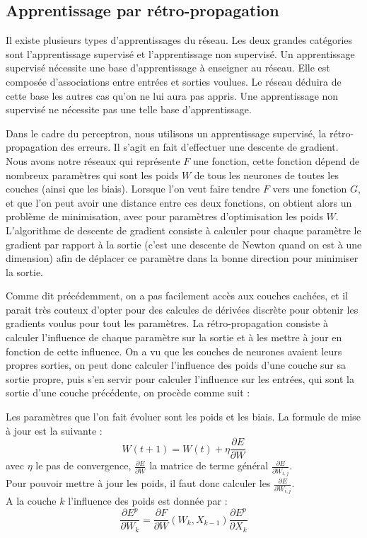 
\subsection{Apprentissage par rétro-propagation}

Il existe plusieurs types d'apprentissages du réseau. Les deux grandes catégories sont l'apprentissage supervisé et l'apprentissage non supervisé. 
Un apprentissage supervisé nécessite une base d'apprentissage à enseigner au réseau. Elle est composée d'associations entre entrées et sorties voulues. Le réseau déduira de cette base les autres cas qu'on ne lui aura pas appris. Une apprentissage non supervisé ne nécessite pas une telle base d'apprentissage.

Dans le cadre du perceptron, nous utilisons un apprentissage supervisé, la rétro-propagation des erreurs. Il s'agit en fait d'effectuer une descente de gradient. Nous avons notre réseaux qui représente $F$ une fonction, cette fonction dépend de nombreux paramètres qui sont les poids $W$ de tous les neurones de toutes les couches (ainsi que les biais). Lorsque l'on veut faire tendre $F$ vers une fonction $G$, et que l'on peut avoir une distance entre ces deux fonctions, on obtient alors un problème de minimisation, avec pour paramètres d'optimisation les poids $W$. L'algorithme de descente de gradient consiste à calculer pour chaque paramètre le gradient par rapport à la sortie (c'est une descente de Newton quand on est à une dimension) afin de déplacer ce paramètre dans la bonne direction pour minimiser la sortie.

Comme dit précédemment, on a pas facilement accès aux couches cachées, et il parait très couteux d'opter pour des calcules de dérivées discrète pour obtenir les gradients voulus pour tout les paramètres.
La rétro-propagation consiste à calculer l’influence de chaque paramètre sur la sortie et à les mettre à jour en fonction de cette influence. On a vu que les couches de neurones avaient leurs propres sorties, on peut donc calculer l'influence des poids d'une couche sur sa sortie propre, puis s'en servir pour calculer l'influence sur les entrées, qui sont la sortie d'une couche précédente, on procède comme suit : 

Les paramètres que l’on fait évoluer sont les poids et les biais.
La formule de mise à jour est la suivante :
\[
W(t+1) = W(t) + \eta \frac{\partial E}{\partial W} 
\]
avec $\eta$ le pas de convergence, $\frac{\partial E}{\partial W} $ la matrice de terme général $\frac{\partial E}{\partial W_{i,j}} $.\\
Pour pouvoir mettre à jour les poids, il faut donc calculer les $\frac{\partial E}{\partial W_{i,j}} $.\\
A la couche $k$ l'influence des poids est donnée par : 
\[
	\frac{\partial E^p}{\partial W _k} = \frac{\partial F}{\partial W}(W_k, X_{k-1})\frac{\partial E^p}{\partial X_k}
\]

